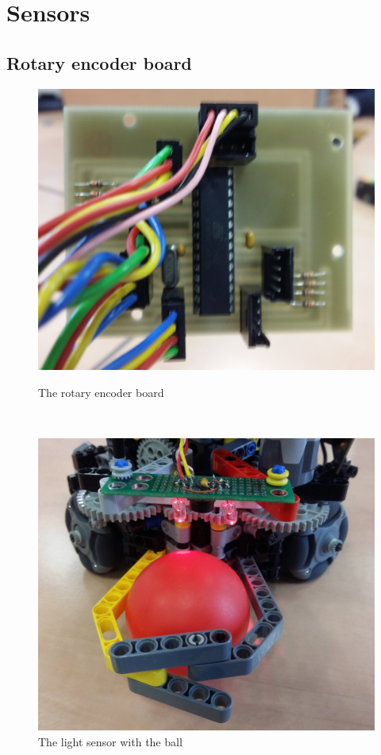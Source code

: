 \documentclass[a4paper,12pt]{article}
\begin{document}
\section{Sensors}
\subsection{Rotary encoder board}

\begin{figure}[ht!]
	\begin{minipage}[b]{.49\textwidth}
        \centering
\includegraphics[scale=.08]{rotary1}
\caption{The rotary encoder board}
\label{fig:rotary}
	\end{minipage}
	~
	\begin{minipage}[b]{.48\textwidth}
        \centering
\includegraphics[scale=.09]{sensor3}
\caption{The light sensor with the ball}
\label{fig:sensor}
	\end{minipage}
\end{figure}
\end{document}
